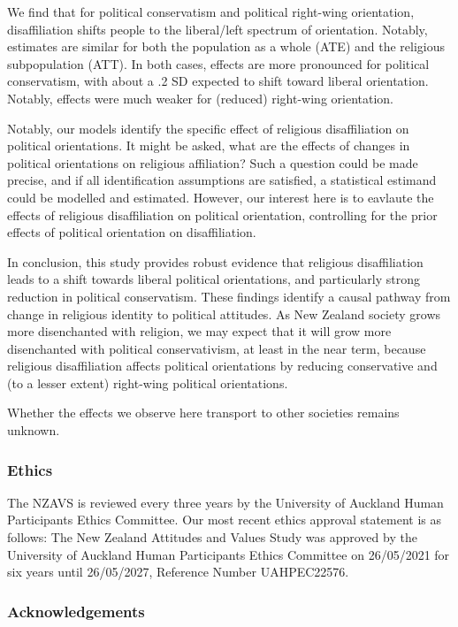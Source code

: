 \documentclass[
  singlecolumn]{article}
\begin{document}
We find that for political conservatism and political right-wing
orientation, disaffiliation shifts people to the liberal/left spectrum
of orientation. Notably, estimates are similar for both the population
as a whole (ATE) and the religious subpopulation (ATT). In both cases,
effects are more pronounced for political conservatism, with about a .2
SD expected to shift toward liberal orientation. Notably, effects were
much weaker for (reduced) right-wing orientation.

Notably, our models identify the specific effect of religious
disaffiliation on political orientations. It might be asked, what are
the effects of changes in political orientations on religious
affiliation? Such a question could be made precise, and if all
identification assumptions are satisfied, a statistical estimand could
be modelled and estimated. However, our interest here is to eavlaute the
effects of religious disaffiliation on political orientation,
controlling for the prior effects of political orientation on
disaffiliation.

In conclusion, this study provides robust evidence that religious
disaffiliation leads to a shift towards liberal political orientations,
and particularly strong reduction in political conservatism. These
findings identify a causal pathway from change in religious identity to
political attitudes. As New Zealand society grows more disenchanted with
religion, we may expect that it will grow more disenchanted with
political conservativism, at least in the near term, because religious
disaffiliation affects political orientations by reducing conservative
and (to a lesser extent) right-wing political orientations.

Whether the effects we observe here transport to other societies remains
unknown.

\newpage{}

\subsubsection{Ethics}\label{ethics}

The NZAVS is reviewed every three years by the University of Auckland
Human Participants Ethics Committee. Our most recent ethics approval
statement is as follows: The New Zealand Attitudes and Values Study was
approved by the University of Auckland Human Participants Ethics
Committee on 26/05/2021 for six years until 26/05/2027, Reference Number
UAHPEC22576.

\subsubsection{Acknowledgements}\label{acknowledgements}
\end{document}
